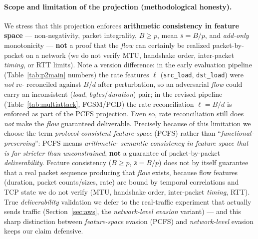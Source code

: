 \documentclass[preprint,12pt,authoryear]{elsarticle}
\begin{document}
\paragraph{Scope and limitation of the projection (methodological honesty).} We
stress that this projection enforces \textbf{arithmetic consistency in feature
space} --- non-negativity, packet integrality, $B \ge p$, mean $\bar{s}=B/p$, and
\emph{add-only} monotonicity --- \textbf{not} a proof that the \emph{flow} can
certainly be realized packet-by-packet on a network (we do not verify MTU,
handshake order, inter-packet \emph{timing}, or RTT limits). Note a version
difference: in the early evaluation pipeline (Table~\ref{tab:p2main} numbers) the
rate features $\ell$ (\texttt{src\_load}, \texttt{dst\_load}) were \emph{not} re-
reconciled against $B/d$ after perturbation, so an adversarial \emph{flow} could
carry an inconsistent (\emph{load}, \emph{bytes}/\emph{duration}) pair; in the
revised pipeline (Table~\ref{tab:multiattack}, FGSM/PGD) the rate reconciliation
$\ell=B/d$ is enforced as part of the PCFS projection. Even so, rate reconciliation
still does \emph{not} make the \emph{flow} guaranteed deliverable. Precisely because
of this limitation we choose the term \emph{protocol-consistent feature-space}
(PCFS) rather than ``\emph{functional-preserving}'': PCFS means \emph{arithmetic-
semantic consistency in feature space that is far stricter than unconstrained},
\textbf{not} a guarantee of packet-by-packet \emph{deliverability}. Feature
consistency ($B\ge p$, $\bar{s}=B/p$) does not by itself guarantee that a real
packet sequence producing that \emph{flow} exists, because flow features (duration,
packet counts/sizes, rate) are bound by temporal correlations and TCP state we do
not verify (MTU, handshake order, inter-packet \emph{timing}, RTT). True
\emph{deliverability} validation we defer to the real-traffic experiment that
actually sends traffic (Section~\ref{sec:aws}, the \emph{network-level evasion}
variant) --- and this sharp distinction between \emph{feature-space} evasion (PCFS)
and \emph{network-level} evasion keeps our claim defensive.
\end{document}
